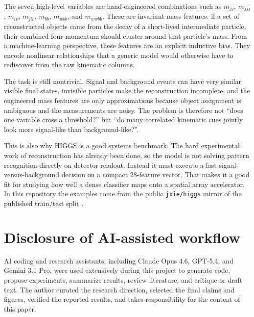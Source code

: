 \documentclass[a4paper,11pt]{article}
\newcommand{\code}[1]{\texttt{#1}}
\begin{document}
The seven high-level variables are hand-engineered combinations such as
$m_{jj}$, $m_{jjj}$, $m_{lv}$, $m_{jlv}$, $m_{bb}$, $m_{wbb}$, and $m_{wwbb}$.
These are invariant-mass features: if a set of reconstructed objects came from
the decay of a short-lived intermediate particle, their combined four-momentum
should cluster around that particle's mass. From a machine-learning
perspective, these features are an explicit inductive bias. They encode
nonlinear relationships that a generic model would otherwise have to rediscover
from the raw kinematic columns.

The task is still nontrivial. Signal and background events can have very
similar visible final states, invisible particles make the reconstruction
incomplete, and the engineered mass features are only approximations because
object assignment is ambiguous and the measurements are noisy. The problem is
therefore not ``does one variable cross a threshold?'' but ``do many correlated
kinematic cues jointly look more signal-like than background-like?''.

This is also why HIGGS is a good systems benchmark. The hard experimental work
of reconstruction has already been done, so the model is not solving pattern
recognition directly on detector readout. Instead it must execute a fast
signal-versus-background decision on a compact 28-feature vector. That makes it
a good fit for studying how well a dense classifier maps onto a spatial array
accelerator. In this repository the examples come from the public
\code{jxie/higgs} mirror of the published train/test split \cite{jxie-higgs}.

\FloatBarrier
\clearpage
\section*{Disclosure of AI-assisted workflow}

AI coding and research assistants, including Claude Opus 4.6, GPT-5.4, and
Gemini 3.1 Pro, were used extensively during this project to generate code,
propose experiments, summarize results, review literature, and critique or
draft text. The author curated the research direction, selected the final
claims and figures, verified the reported results, and takes responsibility for
the content of this paper.
\end{document}
